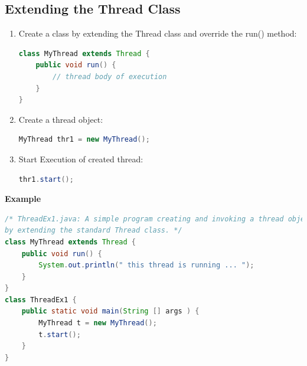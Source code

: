 \documentclass[12pt, a4paper]{book}
\begin{document}
\subsection{Extending the Thread Class}
\begin{enumerate}
    \item  Create a class by extending the Thread class and override the run() method:
          \begin{lstlisting}[language=java]
class MyThread extends Thread {
    public void run() {
	    // thread body of execution
    }
}
    \end{lstlisting}
    \item Create a thread object:
          \begin{lstlisting}[language=java]
MyThread thr1 = new MyThread();
    \end{lstlisting}
    \item Start Execution of created thread: \begin{lstlisting}[language=java]
thr1.start();
    \end{lstlisting}
\end{enumerate}
\textbf{Example} \\
\begin{lstlisting}[language=java]
/* ThreadEx1.java: A simple program creating and invoking a thread object 
by extending the standard Thread class. */
class MyThread extends Thread {
    public void run() {
        System.out.println(" this thread is running ... ");
    }
}
class ThreadEx1 {
    public static void main(String [] args ) {
        MyThread t = new MyThread();
        t.start();
    }
}
\end{lstlisting}
\end{document}
